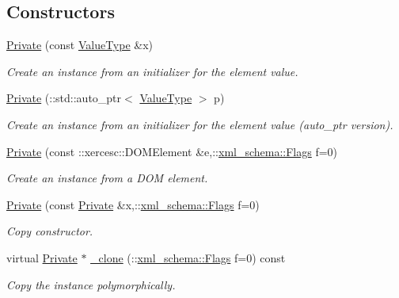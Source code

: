 \subsection*{Constructors}
\begin{DoxyCompactItemize}
\item 
\hyperlink{classopenstack_1_1xml_1_1Private_a1331341fcd0073077bb93859228d8d87}{Private} (const \hyperlink{classopenstack_1_1xml_1_1AddressList}{ValueType} \&x)
\begin{DoxyCompactList}\small\item\em Create an instance from an initializer for the element value. \item\end{DoxyCompactList}\item 
\hyperlink{classopenstack_1_1xml_1_1Private_a184f2d3d439a693336d2fa21bc56f8ad}{Private} (::std::auto\_\-ptr$<$ \hyperlink{classopenstack_1_1xml_1_1AddressList}{ValueType} $>$ p)
\begin{DoxyCompactList}\small\item\em Create an instance from an initializer for the element value (auto\_\-ptr version). \item\end{DoxyCompactList}\item 
\hyperlink{classopenstack_1_1xml_1_1Private_a310cfb48bd13453dd69900412eee52cb}{Private} (const ::xercesc::DOMElement \&e,::\hyperlink{namespacexml__schema_affb4c227cbd9aa7453dd1dc5a1401943}{xml\_\-schema::Flags} f=0)
\begin{DoxyCompactList}\small\item\em Create an instance from a DOM element. \item\end{DoxyCompactList}\item 
\hyperlink{classopenstack_1_1xml_1_1Private_aaa8daa0ab59a06f0e89ce06b918aa9ea}{Private} (const \hyperlink{classopenstack_1_1xml_1_1Private}{Private} \&x,::\hyperlink{namespacexml__schema_affb4c227cbd9aa7453dd1dc5a1401943}{xml\_\-schema::Flags} f=0)
\begin{DoxyCompactList}\small\item\em Copy constructor. \item\end{DoxyCompactList}\item 
virtual \hyperlink{classopenstack_1_1xml_1_1Private}{Private} $\ast$ \hyperlink{classopenstack_1_1xml_1_1Private_a62514eb439836a94665573b1963889e2}{\_\-clone} (::\hyperlink{namespacexml__schema_affb4c227cbd9aa7453dd1dc5a1401943}{xml\_\-schema::Flags} f=0) const 
\begin{DoxyCompactList}\small\item\em Copy the instance polymorphically. \item\end{DoxyCompactList}\end{DoxyCompactItemize}
